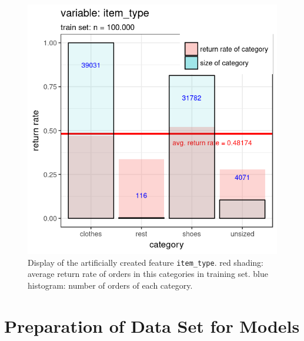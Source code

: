 \documentclass[a4paper,12pt]{article}
\begin{document}
\begin{figure}
  \begin{minipage}[c]{0.55\textwidth}
    \includegraphics[width=\textwidth]{pictures/item_type.png}
  \end{minipage}\hfill
  \begin{minipage}[c]{0.4\textwidth}
    \caption{Display of the artificially created feature \texttt{item\_type}. red shading: average return rate of orders in this categories in training set. blue histogram: number of orders of each category.}
    \label{Figure::ItemType}
  \end{minipage}
\end{figure}



\section{Preparation of Data Set for Models}\label{Sec::PrepDataSet}
\end{document}
